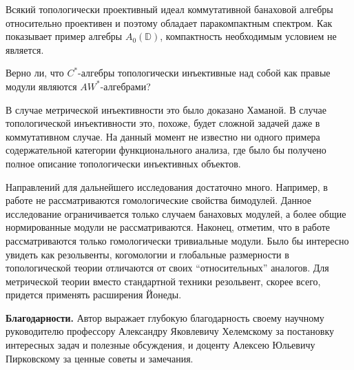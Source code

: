 Всякий топологически проективный идеал коммутативной банаховой алгебры
относительно проективен и поэтому обладает паракомпактным спектром. Как
показывает пример алгебры $A_0(\mathbb{D})$, компактность необходимым условием
не является.

\begin{problem*} Верно ли, что $C^*$-алгебры топологически инъективные над собой
    как правые модули являются $AW^*$-алгебрами?
\end{problem*}

В случае метрической инъективности это было доказано Хаманой. В случае
топологической инъективности это, похоже, будет сложной задачей даже в
коммутативном случае. На данный момент не известно ни одного примера
содержательной категории функционального анализа, где было бы получено полное
описание топологически инъективных объектов.

Направлений для дальнейшего исследования достаточно много. Например, в работе не
рассматриваются гомологические свойства бимодулей. Данное исследование
ограничивается только случаем банаховых модулей, а более общие нормированные
модули не рассматриваются. Наконец, отметим, что в работе рассматриваются только
гомологически тривиальные модули. Было бы интересно увидеть как резольвенты,
когомологии и глобальные размерности в топологической теории отличаются от своих
``относительных'' аналогов. Для метрической теории вместо стандартной техники
резольвент, скорее всего, придется применять расширения Йонеды.

\textbf{Благодарности.} Автор выражает глубокую благодарность своему научному
руководителю профессору Александру Яковлевичу Хелемскому за постановку
интересных задач и полезные обсуждения, и доценту Алексею Юльевичу Пирковскому
за ценные советы и замечания.

\renewcommand{\refname}{\Large Публикации автора по теме диссертации}
\printbibliography[keyword=phdresult]
